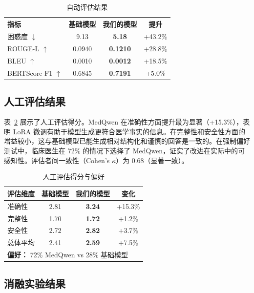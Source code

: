 \documentclass[12pt,a4paper]{article}
\begin{document}
\begin{table}[ht]
\centering
\caption{自动评估结果}
\label{tab:main_results}
\begin{tabular}{lccc}
\toprule
\textbf{指标} & \textbf{基础模型} & \textbf{我们的模型} & \textbf{提升} \\
\midrule
困惑度 $\downarrow$ & 9.13 & \textbf{5.18} & +43.2\% \\
ROUGE-L $\uparrow$ & 0.0940 & \textbf{0.1210} & +28.8\% \\
BLEU $\uparrow$ & 0.0010 & \textbf{0.0012} & +18.5\% \\
BERTScore F1 $\uparrow$ & 0.6845 & \textbf{0.7191} & +5.0\% \\
\bottomrule
\end{tabular}
\end{table}

\subsection{人工评估结果}

表~\ref{tab:human_results} 展示了人工评估得分。MedQwen 在准确性方面提升最为显著（+15.3\%），表明 LoRA 微调有助于模型生成更符合医学事实的信息。在完整性和安全性方面的增益较小，这与基础模型已能生成相对结构化和谨慎的回答是一致的。在强制偏好测试中，临床医生在 72\% 的情况下选择了 MedQwen，证实了改进在实际中的可感知性。评估者间一致性（Cohen's $\kappa$）为 0.68（显著一致）。

\begin{table}[ht]
\centering
\caption{人工评估得分与偏好}
\label{tab:human_results}
\begin{tabular}{lccc}
\toprule
\textbf{评估维度} & \textbf{基础模型} & \textbf{我们的模型} & \textbf{变化} \\
\midrule
准确性 & 2.81 & \textbf{3.24} & +15.3\% \\
完整性 & 1.70 & \textbf{1.72} & +1.2\% \\
安全性 & 2.72 & \textbf{2.82} & +3.7\% \\
\midrule
总体平均 & 2.41 & \textbf{2.59} & +7.5\% \\
\midrule
\multicolumn{4}{l}{\textbf{偏好：} 72\% MedQwen vs 28\% 基础模型} \\
\bottomrule
\end{tabular}
\end{table}

\subsection{消融实验结果}
\end{document}
